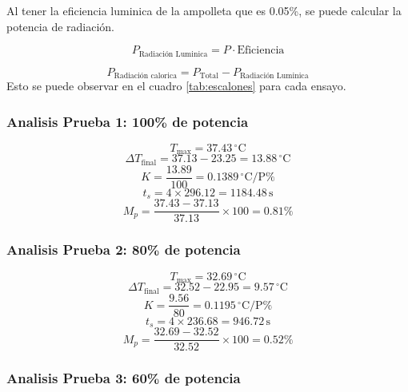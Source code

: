 \documentclass[spanish, a4paper, 11pt]{article}
\begin{document}
Al tener la eficiencia luminica de la ampolleta que es 0.05\%, se puede calcular la potencia de radiación.

\[
P_{\text{Radiación Luminica}} = P \cdot \text{Eficiencia}
\]

\[
P_{\text{Radiación calorica}} = P_{\text{Total}} - P_{\text{Radiación Luminica}}
\]
Esto se puede observar en el cuadro \ref{tab:escalones} para cada ensayo.

\begin{table}[ht]
    \caption{Potencia de radiación según la potencia aplicada.\label{tab:escalones}}
\end{table}
\FloatBarrier

\subsubsection{Analisis Prueba 1: 100\% de potencia} 

\[
T_{\text{max}} = 37.43 \,^\circ\mathrm{C}
\]
\[
\Delta T_{\text{final}} = 37.13 - 23.25 = 13.88 \,^\circ\mathrm{C}
\]
\[
K = \frac{13.89}{100} = 0.1389 \,^\circ\mathrm{C/P\%}
\]
\[
t_s = 4 \times 296.12 = 1184.48 \, \text{s}
\]
\[
M_p = \frac{37.43 - 37.13}{37.13} \times 100 = 0.81\%
\]

\subsubsection{Analisis Prueba 2: 80\% de potencia}

\[
T_{\text{max}} = 32.69 \,^\circ\mathrm{C}
\]
\[
\Delta T_{\text{final}} = 32.52 - 22.95 = 9.57 \,^\circ\mathrm{C}
\]
\[
K = \frac{9.56}{80} = 0.1195 \,^\circ\mathrm{C/P\%}
\]
\[
t_s = 4 \times 236.68 = 946.72 \, \text{s}
\]
\[
M_p = \frac{32.69 - 32.52}{32.52} \times 100 = 0.52\%
\]

\subsubsection{Analisis Prueba 3: 60\% de potencia}
\end{document}
